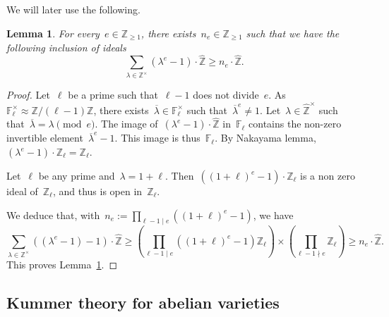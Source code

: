 \documentclass[12pt]{amsart}
\newtheorem{lemma}[theorem]{Lemma}
\newcommand{\F}{{\mathbb F}}
\newcommand{\Z}{{\mathbb Z}}
\newcommand{\ol}{\overline}
\newcommand{\wh}{\widehat}
\begin{document}
\subsection{}

We will later use the following.
\begin{lemma}\label{lem:Lang ne}
For every~$e\in \Z_{\geq1}$, there exists~$n_e\in \Z_{\geq1}$ such that we have the following inclusion of ideals
\[
\sum_{\lambda\in \Z^{\times}} (\lambda^e-1)\cdot \wh{\Z}\geq n_e\cdot \wh{\Z}.
\]
\end{lemma}
\begin{proof}Let~$\ell$ be a prime such that~$\ell-1$ does not divide~$e$. As~$\F_\ell^\times\approx \Z/(\ell-1)\Z$, there exists~$\ol{\lambda}\in \F^\times_\ell$ such that~$\ol{\lambda}^e\neq1$. Let~$\lambda\in \wh{\Z}^\times$ 
such that~$\ol{\lambda}=\lambda\pmod{e}$. The image of~$(\lambda^e-1)\cdot \wh{\Z}$ in~${\F}_\ell$ contains the non-zero invertible element~$\ol{\lambda}^e-1$. This image is thus~${\F}_\ell$.
By Nakayama lemma,~$({\lambda}^e-1)\cdot\Z_\ell=\Z_\ell$.

Let~$\ell$ be any prime and~$\lambda=1+\ell$. Then~$((1+\ell)^e-1)\cdot \Z_\ell$ is a non zero ideal of~$\Z_\ell$, and thus is open in~$\Z_\ell$.

We deduce that, with~$n_e:=\prod_{\ell-1\mid e}((1+\ell)^e-1)$, we have 
\[
\sum_{\lambda\in \Z^{\times}} ((\lambda^e-1)-1)\cdot \wh{\Z}\geq \left(\prod_{\ell-1\mid e}((1+\ell)^e-1)\Z_\ell \right)\times\left(\prod_{\ell-1\nmid e} \Z_\ell\right)\geq n_e\cdot \wh{\Z}.
\] This proves Lemma~\ref{lem:Lang ne}.
\end{proof}

\subsection{Kummer theory for abelian varieties}\label{sec:Kummer}
\end{document}
